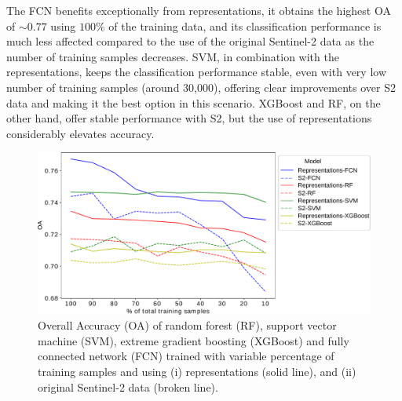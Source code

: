 \documentclass[journal,article,submit,pdftex,moreauthors]{Definitions/mdpi}
\begin{document}
The FCN benefits exceptionally from representations, it obtains the highest \ac{OA} of $\sim 0.77$ using $100 \%$ of the training data, and its classification performance is much less affected compared to the use of the original Sentinel-2 data as the number of training samples decreases. 
SVM, in combination with the representations, keeps the classification performance stable, even with very low number of training samples (around 30,000), offering clear improvements over S2 data and making it the best option in this scenario. XGBoost and RF, on the other hand, offer stable performance with S2, but the use of representations considerably elevates accuracy.


\begin{figure}[H]
	\centering
	\includegraphics[width=\textwidth]{figures/oa_vs_train_pct_corrected-2.pdf}
	\caption{Overall Accuracy (OA) of random forest (RF), support vector machine (SVM), extreme gradient boosting (XGBoost) and fully connected network (FCN) trained with variable percentage of training samples and using (i) representations (solid line), and (ii) original Sentinel-2 data (broken line).}
	\label{oa_vs_train_pct}    
\end{figure}
\end{document}
